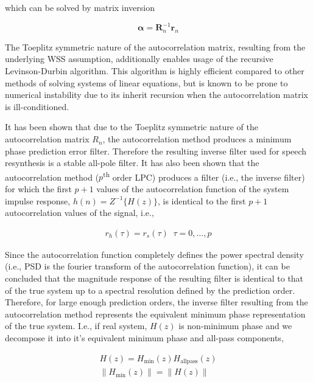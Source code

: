 \noindent
which can be solved by matrix inversion

\begin{equation}
	 \boldsymbol{\alpha} = \boldsymbol{R}_n^{-1} \boldsymbol{r}_n
\end{equation}

The Toeplitz symmetric nature of the autocorrelation matrix, resulting from the underlying WSS assumption, additionally enables usage of the recursive Levinson-Durbin algorithm. This algorithm is highly efficient compared to other methods of solving systems of linear equations, but is known to be prone to numerical instability due to its inherit recursion when the autocorrelation matrix is ill-conditioned.

It has been shown that due to the Toeplitz symmetric nature of the autocorrelation matrix $R_n$, the autocorrelation method produces a minimum phase prediction error filter. Therefore the resulting inverse filter used for speech resynthesis is a stable all-pole filter. It has also been shown that the autocorrelation method ($p$\textsuperscript{th} order LPC) produces a filter (i.e., the inverse filter) for which the first $p+1$ values of the autocorrelation function of the system impulse response, $h(n)=Z^{-1}\{H(z)\}$, is identical to the first $p+1$ autocorrelation values of the signal, i.e.,

\begin{eqnarray}
	r_h(\tau) = r_s(\tau) \;\; \tau=0, \dots, p
\end{eqnarray}

\noindent
Since the autocorrelation function completely defines the power spectral density (i.e., PSD is the fourier transform of the autocorrelation function), it can be concluded that the magnitude response of the resulting filter is identical to that of the true system up to a spectral resolution defined by the prediction order. Therefore, for large enough prediction orders, the inverse filter resulting from the autocorrelation method represents the equivalent minimum phase representation of the true system. I.e., if real system, $H(z)$ is non-minimum phase and we decompose it into it's equivalent minimum phase and all-pass components,

\begin{eqnarray}
	H(z) = H_{\mathrm{min}}(z) H_{\mathrm{allpass}}(z) \\
	\| H_{\mathrm{min}}(z) \| = \| H(z) \|  \\
\end{eqnarray}

